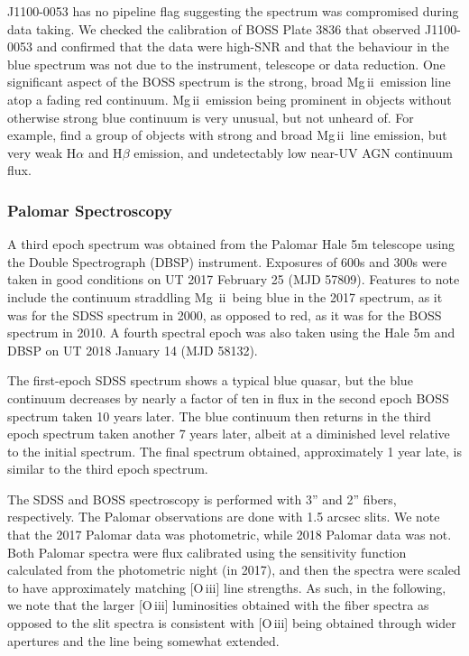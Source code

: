 \documentclass[a4paper,fleqn,usenatbib]{mnras}
\begin{document}
J1100-0053 has no pipeline flag suggesting the spectrum was
compromised during data taking. We checked the calibration of BOSS
Plate 3836 that observed J1100-0053 and confirmed that the data were
high-SNR and that the behaviour in the blue spectrum was not due to
the instrument, telescope or data reduction.  One significant aspect
of the BOSS spectrum is the strong, broad Mg\,{\sc ii}\ emission line
atop a fading red continuum.  Mg\,{\sc ii}\ emission being prominent
in objects without otherwise strong blue continuum is very unusual,
but not unheard of.  For example, \citet{Roig2014} find a group of
objects with strong and broad Mg\,{\sc ii}\ line emission, but very
weak H$\alpha$ and H$\beta$ emission, and undetectably low near-UV AGN
continuum flux.


\subsubsection{Palomar Spectroscopy} 
A third epoch spectrum was obtained from the Palomar Hale 5m telescope
using the Double Spectrograph (DBSP) instrument.  Exposures of 600s
and 300s were taken in good conditions on UT 2017 February 25 (MJD
57809). Features to note include the continuum straddling Mg\,{\sc
ii}\ being blue in the 2017 spectrum, as it was for the SDSS spectrum
in 2000, as opposed to red, as it was for the BOSS spectrum in 2010. A
fourth spectral epoch was also taken using the Hale 5m and DBSP on
UT 2018 January 14 (MJD 58132). 

The first-epoch SDSS spectrum shows a typical blue quasar, but the
blue continuum decreases by nearly a factor of ten in flux in the
second epoch BOSS spectrum taken 10 years later. The blue continuum
then returns in the third epoch spectrum taken another 7 years later,
albeit at a diminished level relative to the initial spectrum. The
final spectrum obtained, approximately 1 year late, is similar to the
third epoch spectrum.

The SDSS and BOSS spectroscopy is performed with 3'' and 2'' fibers,
respectively. The Palomar observations are done with 1.5 arcsec
slits. We note that the 2017 Palomar data was photometric, while 2018
Palomar data was not.  Both Palomar spectra were flux calibrated using
the sensitivity function calculated from the photometric night (in
2017), and then the spectra were scaled to have approximately matching
[O\,{\sc iii}] line strengths. As such, in the following, we note that
the larger [O\,{\sc iii}] luminosities obtained with the fiber spectra
as opposed to the slit spectra is consistent with [O\,{\sc iii}] being
obtained through wider apertures and the line being somewhat extended.
\end{document}
